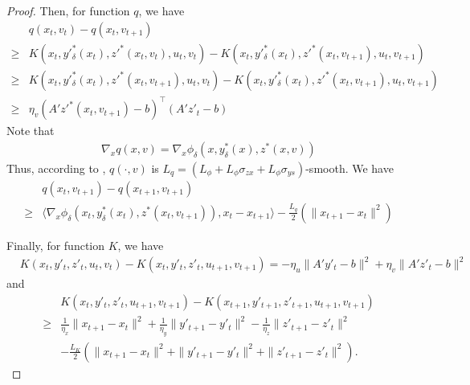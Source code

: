 \documentclass[10pt,a4paper]{amsart}
\begin{document}
\begin{proof}
Then, for function $q$, we have
\begin{align*}
    &q(x_t,v_t)-q(x_t, v_{t+1})\\
    \geq&K(x_t, y'^*_\delta(x_t), z'^*(x_t, v_t), u_t, v_t)-K(x_t, y'^*_\delta(x_t), z'^*(x_t, v_{t+1}), u_t, v_{t+1})\\
    \geq&K(x_t, y'^*_\delta(x_t), z'^*(x_t, v_{t+1}), u_t, v_t)-K(x_t, y'^*_\delta(x_t), z'^*(x_t, v_{t+1}), u_t, v_{t+1})\\
    \geq&\eta_v(A'z'^*(x_t,v_{t+1})-b)^\top(A'z'_t-b)
\end{align*}
Note that
\begin{align*}
    \nabla_x q(x,v)=\nabla_x \phi_\delta(x, y^*_\delta(x), z^*(x,v))
\end{align*}
Thus, according to , $q(\cdot,v)$ is $L_q=(L_\phi+L_\phi\sigma_{zx}+L_\phi\sigma_{ys})$-smooth. We have
\begin{align*}
    &q(x_t,v_{t+1})-q(x_{t+1}, v_{t+1})\\
    \geq&\langle\nabla_x \phi_\delta(x_t, y_\delta^*(x_t), z^*(x_t, v_{t+1})), x_t-x_{t+1}\rangle-\frac{L_q}{2}(\|x_{t+1}-x_t\|^2)
\end{align*}

Finally, for function $K$, we have
\begin{align*}
    &K(x_t, y'_t, z'_t, u_t, v_t)-K(x_t, y'_t, z'_t, u_{t+1}, v_{t+1})=-\eta_u\|A'y'_t-b\|^2+\eta_v\|A'z'_t-b\|^2
\end{align*}
and
\begin{align*}
    &K(x_t, y'_t, z'_t, u_{t+1}, v_{t+1})-K(x_{t+1}, y'_{t+1}, z'_{t+1}, u_{t+1}, v_{t+1})\\
    \geq& \frac{1}{\eta_x}\|x_{t+1}-x_t\|^2+\frac{1}{\eta_y}\|y'_{t+1}-y'_t\|^2-\frac{1}{\eta_z}\|z'_{t+1}-z'_t\|^2\\
    &-\frac{L_K}{2}(\|x_{t+1}-x_t\|^2+\|y'_{t+1}-y'_t\|^2+\|z'_{t+1}-z'_t\|^2).
\end{align*}



\end{proof}
\end{document}
